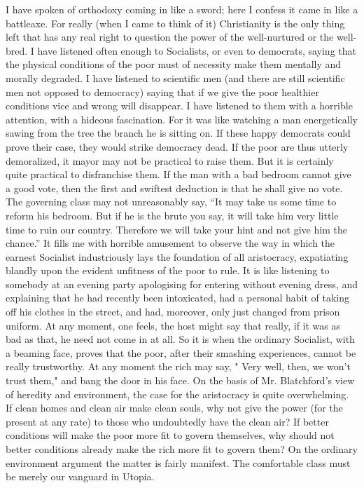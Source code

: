 \documentclass{book}
\begin{document}
I have spoken of orthodoxy coming in like a sword; here I confess it came in like a battleaxe. For really (when I came to think of it) Christianity is the only thing left that has any real right to question the power of the well-nurtured or the well-bred. I have listened often enough to Socialists, or even to democrats, saying that the physical conditions of the poor must of necessity make them mentally and morally degraded. I have listened to scientific men (and there are still scientific men not opposed to democracy) saying that if we give the poor healthier conditions vice and wrong will disappear. I have listened to them with a horrible attention, with a hideous fascination. For it was like watching a man energetically sawing from the tree the branch he is sitting on. If these happy democrats could prove their case, they would strike democracy dead. If the poor are thus utterly demoralized, it mayor may not be practical to raise them. But it is certainly quite practical to disfranchise them. If the man with a bad bedroom cannot give a good vote, then the first and swiftest deduction is that he shall give no vote. The governing class may not unreasonably say, “It may take us some time to reform his bedroom. But if he is the brute you say, it will take him very little time to ruin our country. Therefore we will take your hint and not give him the chance.” It fills me with horrible amusement to observe the way in which the earnest Socialist industriously lays the foundation of all aristocracy, expatiating blandly upon the evident unfitness of the poor to rule. It is like listening to somebody at an evening party apologising for entering without evening dress, and explaining that he had recently been intoxicated, had a personal habit of taking off his clothes in the street, and had, moreover, only just changed from prison uniform. At any moment, one feels, the host might say that really, if it was as bad as that, he need not come in at all. So it is when the ordinary Socialist, with a beaming face, proves that the poor, after their smashing experiences, cannot be really trustworthy. At any moment the rich may say, " Very well, then, we won’t trust them," and bang the door in his face. On the basis of Mr. Blatchford’s view of heredity and environment, the case for the aristocracy is quite overwhelming. If clean homes and clean air make clean souls, why not give the power (for the present at any rate) to those who undoubtedly have the clean air? If better conditions will make the poor more fit to govern themselves, why should not better conditions already make the rich more fit to govern them? On the ordinary environment argument the matter is fairly manifest. The comfortable class must be merely our vanguard in Utopia.
\end{document}
